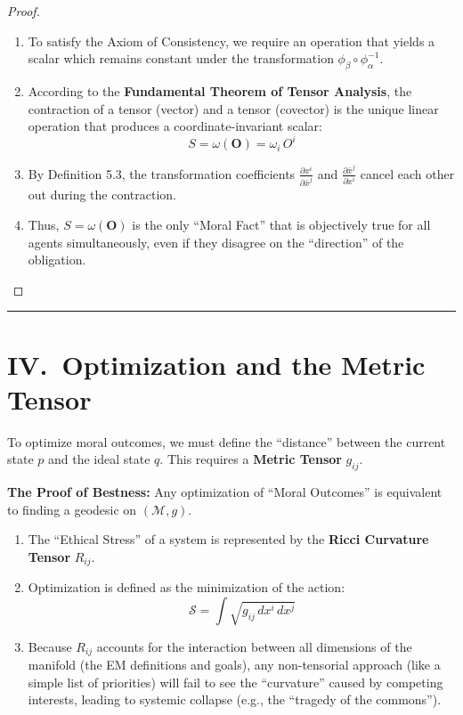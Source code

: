 \documentclass[12pt]{article}
\theoremstyle{remark}
\begin{document}
\begin{proof}
\begin{enumerate}
    \item To satisfy the Axiom of Consistency, we require an operation that
    yields a scalar which remains constant under the transformation
    $\phi_\beta \circ \phi_\alpha^{-1}$.

    \item According to the \textbf{Fundamental Theorem of Tensor Analysis}, the
    contraction of a tensor (vector) and a tensor (covector) is the unique
    linear operation that produces a coordinate-invariant scalar:
    \[
        S = \omega(\mathbf{O}) = \omega_i\, O^i
    \]

    \item By Definition 5.3, the transformation coefficients
    $\frac{\partial x^i}{\partial \bar{x}^j}$ and
    $\frac{\partial \bar{x}^j}{\partial x^i}$ cancel each other out during the
    contraction.

    \item Thus, $S = \omega(\mathbf{O})$ is the only ``Moral Fact'' that is
    objectively true for all agents simultaneously, even if they disagree on
    the ``direction'' of the obligation.
\end{enumerate}
\end{proof}

\bigskip
\hrule
\bigskip

\section*{IV.\ Optimization and the Metric Tensor}

To optimize moral outcomes, we must define the ``distance'' between the current
state $p$ and the ideal state $q$. This requires a \textbf{Metric Tensor}
$g_{ij}$.

\medskip

\noindent\textbf{The Proof of Bestness:} Any optimization of ``Moral Outcomes''
is equivalent to finding a geodesic on $(\mathcal{M}, g)$.

\begin{enumerate}
    \item The ``Ethical Stress'' of a system is represented by the
    \textbf{Ricci Curvature Tensor} $R_{ij}$.

    \item Optimization is defined as the minimization of the action:
    \[
        \mathcal{S} = \int \sqrt{g_{ij}\, dx^i\, dx^j}
    \]

    \item Because $R_{ij}$ accounts for the interaction between all dimensions
    of the manifold (the EM definitions and goals), any non-tensorial approach
    (like a simple list of priorities) will fail to see the ``curvature'' caused
    by competing interests, leading to systemic collapse (e.g., the ``tragedy
    of the commons'').
\end{enumerate}
\end{document}
